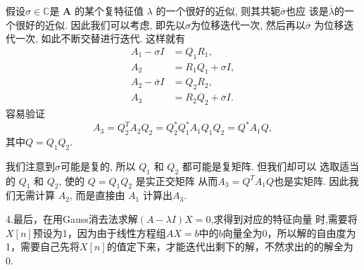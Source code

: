 假设$\sigma \in \mathbb{C}$是 $\bm{A}$ 的某个复特征值 $\lambda$ 的一个很好的近似, 则其共轭$\overline{\sigma}$也应
该是$\overline{\lambda}$的一个很好的近似. 因此我们可以考虑, 即先以$\sigma$为位移迭代一次, 然后再以$\overline{\sigma}$ 为位移迭代一次, 如此不断交替进行迭代.
这样就有
\begin{align*}
A_1-\sigma I&=Q_1R_1, \\
A_2&=R_1Q_1+\sigma I,\\
A_2-\overline{\sigma}I&=Q_2R_2, \\
A_3&=R_2Q_2+\overline{\sigma}I.
\end{align*}
容易验证
\[A_3=Q_2^TA_2Q_2=Q_2^{\ast}Q_1^{\ast}A_1Q_1Q_2=Q^{\ast}A_1Q,
\]
其中$Q=Q_1Q_2$.

我们注意到$\sigma$可能是复的, 所以 $Q_1$ 和 $Q_2$ 都可能是复矩阵. 但我们却可以
选取适当的 $Q_1$ 和 $Q_2$, 使的 $Q=Q_1Q_2$ 是实正交矩阵
从而$A_3 = Q^T A_1Q $也是实矩阵. 因此我们无需计算 $A_2$, 而是直接由 $A_1$ 计算出$A_3$.

4.最后，在用Gauss消去法求解$(A-\lambda I)X=0$,求得到对应的特征向量
时,需要将$X[n]$预设为1，因为由于线性方程组$AX=b$中的$b$向量全为0，所以解的自由度为1，需要自己先将$X[n]$的值定下来，才能迭代出剩下的解，不然求出的的解全为0.

